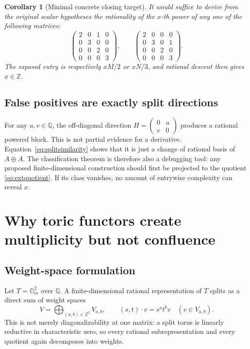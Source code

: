 \documentclass[11pt,oneside]{article}
\newtheorem{corollary}[theorem]{Corollary}
\theoremstyle{definition}
\theoremstyle{remark}
\newcommand{\Z}{\mathbb Z}
\newcommand{\Q}{\mathbb Q}
\begin{document}
\begin{corollary}[Minimal concrete closing target]
\label{cor:minimalclosing}
It would suffice to derive from the original scalar hypotheses the rationality of the $x$-th
power of any one of the following matrices:
\[
 \begin{pmatrix}
 2&0&1&0\\0&3&0&0\\0&0&2&0\\0&0&0&3
 \end{pmatrix},
 \qquad
 \begin{pmatrix}
 2&0&0&0\\0&3&0&1\\0&0&2&0\\0&0&0&3
 \end{pmatrix}.
\]
The exposed entry is respectively $xM/2$ or $xN/3$, and rational descent then gives
$x\in\Z$.
\end{corollary}

\subsection{False positives are exactly split directions}

For any $u,v\in\Q$, the off-diagonal direction
$H=\left(\begin{smallmatrix}0&u\\v&0\end{smallmatrix}\right)$ produces a rational powered
block.  This is not partial evidence for a derivative.  Equation~\eqref{eq:splitsimilarity}
shows that it is just a change of rational basis of $A\oplus A$.  The classification theorem
is therefore also a debugging tool: any proposed finite-dimensional construction should first
be projected to the quotient \eqref{eq:extquotient}.  If its class vanishes, no amount of
entrywise complexity can reveal $x$.

\section{Why toric functors create multiplicity but not confluence}
\label{sec:toricnogo}

\subsection{Weight-space formulation}

Let $T=\mathbb G_m^2$ over $\Q$.  A finite-dimensional rational representation of $T$ splits
as a direct sum of weight spaces
\begin{equation}
 V=\bigoplus_{(a,b)\in\Z^2}V_{a,b},
 \qquad
 (s,t)\cdot v=s^at^b v
 \quad(v\in V_{a,b}).
 \label{eq:weightsplit}
\end{equation}
This is not merely diagonalizability at one matrix: a split torus is linearly reductive in
characteristic zero, so every rational subrepresentation and every quotient again decomposes
into weights.
\end{document}
